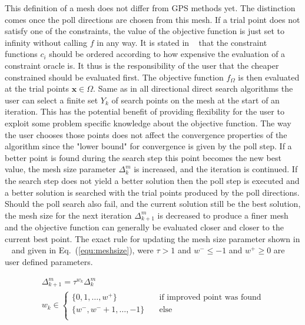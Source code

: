 \documentclass[a4paper,10pt]{article}
\renewcommand{\vec}[1]{\mathbf{#1}}
\newcommand{\equref}[1]{Eq.~(\ref{#1})}
\begin{document}
    This definition of a mesh does not differ from GPS methods yet.
    The distinction comes once the poll directions are chosen from this mesh.
    If a trial point does not satisfy one of the constraints, the value of
    the objective function is just set to infinity without calling $f$ in
    any way.
    It is stated in ~\cite{mads_original} that the constraint functions
    $c_i$ should be ordered according to how expensive the evaluation
    of a constraint oracle is.
    It thus is the responsibility of the user that the cheaper constrained
    should be evaluated first.
    The objective function $f_{\Omega}$ is then evaluated at the trial
    points $\vec{x} \in \Omega$.
    Same as in all directional direct search algorithms the user can
    select a finite set $Y_k$ of search points on the mesh at the
    start of an iteration.
    This has the potential benefit of providing flexibility for the user
    to exploit some problem specific knowledge about the objective
    function.
    The way the user chooses those points does not affect the convergence
    properties of the algorithm since the "lower bound" for convergence
    is given by the poll step.
    If a better point is found during the search step this point becomes
    the new best value, the mesh size parameter $\Delta^m_k$ is increased,
    and the iteration is continued.
    If the search step does not yield a better solution then the poll
    step is executed and a better solution is searched with the
    trial points produced by the poll directions.
    Should the poll search also fail, and the current solution
    still be the best solution, the mesh size for the next iteration
    $\Delta^m_{k+1}$ is decreased to produce a finer mesh and the
    objective function can generally be evaluated closer and closer
    to the current best point.
    The exact rule for updating the mesh size parameter shown in
    ~\cite{mads_original} and given in \equref{equ:meshsize}, were
    $\tau > 1$ and $w^- \leq -1$ and $w^+ \geq 0$ are user defined
    parameters.

    \begin{equation}
    \label{equ:meshsize}
    \begin{gathered}
    \Delta^m_{k+1} = \tau^{w_k}\Delta^m_k \\
    w_k \in 
    \begin{cases}
        \{ 0,1,\dots,w^+\} &\quad \text{if improved point was found} \\
        \{w^-,w^- + 1,\dots, -1\} &\quad \text{else} \\
    \end{cases}
    \end{gathered}
    \end{equation}
\end{document}
